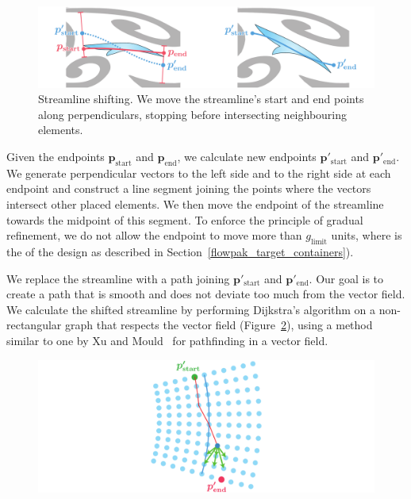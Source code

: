 \begin{figure}
 \includegraphics[width=1.0\textwidth]{figures/flowpak/shift_streamline.pdf}
 \caption[Shifting a streamline]
 {\label{shift_streamline}
 Streamline shifting.
  We move the streamline's start and end points along 
  perpendiculars, stopping before intersecting neighbouring elements.}
\end{figure}


Given the endpoints $\bm{p_\mathrm{start}}$ and $\bm{p_\mathrm{end}}$, we 
calculate new endpoints $\bm{p'_\mathrm{start}}$ and $\bm{p'_\mathrm{end}}$.
We generate perpendicular
vectors to the left side and to the right side at each endpoint and construct
a line segment joining the points where the vectors intersect other placed elements.
We then move the endpoint of the streamline towards the midpoint of this
segment. To enforce the principle of gradual refinement, we do not allow the
endpoint to move more than $g_\mathrm{limit}$ units, where 
 is the 
of the design as described in Section~\ref{flowpak_target_containers}).

We replace the streamline with a path joining
$\bm{p'_\mathrm{start}}$ and $\bm{p'_\mathrm{end}}$. Our goal
is to create a path that is smooth and does not deviate too much from the vector
field.  We calculate the shifted streamline by performing Dijkstra's
algorithm on a non-rectangular graph that respects the vector field
(Figure~\ref{dijkstra}), using a method similar to one by Xu and Mould~\cite{Xu2015} for
pathfinding in a vector field.

\begin{figure}
\includegraphics[width=1.0\textwidth]{figures/flowpak/dijkstra.pdf}
 \caption[Tracing a shortest path]
 {\label{dijkstra}
 }
\end{figure}

